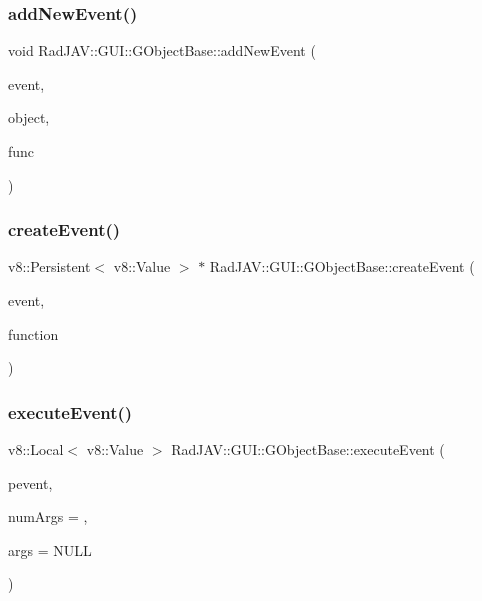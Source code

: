 \subsubsection{\texorpdfstring{add\+New\+Event()}{addNewEvent()}}
{\footnotesize\ttfamily void Rad\+J\+A\+V\+::\+G\+U\+I\+::\+G\+Object\+Base\+::add\+New\+Event (\begin{DoxyParamCaption}\item[{\mbox{\hyperlink{class_rad_j_a_v_1_1_string}{String}}}]{event,  }\item[{wx\+Window $\ast$}]{object,  }\item[{v8\+::\+Local$<$ v8\+::\+Function $>$}]{func }\end{DoxyParamCaption})}

\mbox{\label{class_rad_j_a_v_1_1_g_u_i_1_1_g_object_base_a2d1f371d8f289dfdd262ec447c83a5a9}} 
\subsubsection{\texorpdfstring{create\+Event()}{createEvent()}}
{\footnotesize\ttfamily v8\+::\+Persistent$<$ v8\+::\+Value $>$ $\ast$ Rad\+J\+A\+V\+::\+G\+U\+I\+::\+G\+Object\+Base\+::create\+Event (\begin{DoxyParamCaption}\item[{\mbox{\hyperlink{class_rad_j_a_v_1_1_string}{String}}}]{event,  }\item[{v8\+::\+Local$<$ v8\+::\+Function $>$}]{function }\end{DoxyParamCaption})}

\mbox{\label{class_rad_j_a_v_1_1_g_u_i_1_1_g_object_base_a6ae8c6fadf1d34da7d0fbd04e7c43030}} 
\subsubsection{\texorpdfstring{execute\+Event()}{executeEvent()}}
{\footnotesize\ttfamily v8\+::\+Local$<$ v8\+::\+Value $>$ Rad\+J\+A\+V\+::\+G\+U\+I\+::\+G\+Object\+Base\+::execute\+Event (\begin{DoxyParamCaption}\item[{v8\+::\+Persistent$<$ v8\+::\+Value $>$ $\ast$}]{pevent,  }\item[{R\+J\+I\+NT}]{num\+Args = {},  }\item[{v8\+::\+Local$<$ v8\+::\+Value $>$ $\ast$}]{args = {\ttfamily NULL} }\end{DoxyParamCaption})\hspace{0.3cm}{\ttfamily [static]}}


